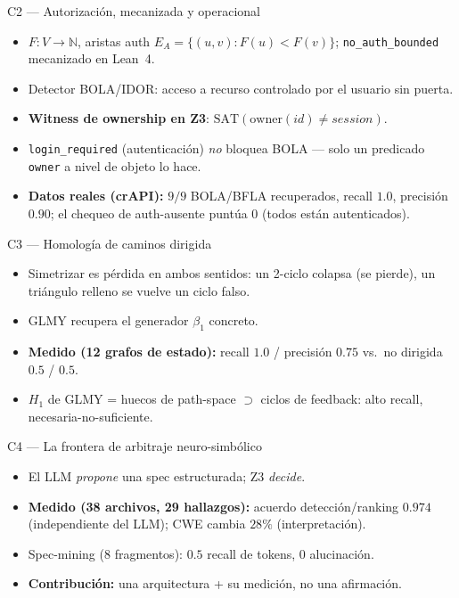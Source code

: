\documentclass[aspectratio=169,11pt]{beamer}
\newcommand{\N}{\mathbb{N}}
\begin{document}
\begin{frame}{C2 --- Autorización, mecanizada y operacional}
  \begin{itemize}
    \item $F:V\to\N$, aristas auth $E_A=\{(u,v):F(u)<F(v)\}$; \texttt{no\_auth\_bounded}
          mecanizado en Lean~4.
    \item Detector BOLA/IDOR: acceso a recurso controlado por el usuario sin puerta.
    \item \textbf{Witness de ownership en Z3}: $\mathrm{SAT}(\mathrm{owner}(id)\neq session)$.
    \item \texttt{login\_required} (autenticación) \emph{no} bloquea BOLA --- solo
          un predicado \texttt{owner} a nivel de objeto lo hace.
    \item \textbf{Datos reales (crAPI):} $9/9$ BOLA/BFLA recuperados, recall $1.0$,
          precisión $0.90$; el chequeo de auth-ausente puntúa $0$ (todos están autenticados).
  \end{itemize}
\end{frame}

\begin{frame}{C3 --- Homología de caminos dirigida}
  \begin{itemize}
    \item Simetrizar es pérdida en ambos sentidos: un 2-ciclo colapsa (se pierde),
          un triángulo relleno se vuelve un ciclo falso.
    \item GLMY recupera el generador $\beta_1$ concreto.
    \item \textbf{Medido (12 grafos de estado):} recall $1.0$ / precisión $0.75$
          vs.\ no dirigida $0.5$ / $0.5$.
    \item $H_1$ de GLMY = huecos de path-space $\supset$ ciclos de feedback:
          alto recall, necesaria-no-suficiente.
  \end{itemize}
\end{frame}

\begin{frame}{C4 --- La frontera de arbitraje neuro-simbólico}
  \begin{itemize}
    \item El LLM \emph{propone} una spec estructurada; Z3 \emph{decide}.
    \item \textbf{Medido (38 archivos, 29 hallazgos):} acuerdo detección/ranking
          $0.974$ (independiente del LLM); CWE cambia $28\%$ (interpretación).
    \item Spec-mining (8 fragmentos): $0.5$ recall de tokens, $0$ alucinación.
    \item \textbf{Contribución:} una arquitectura + su medición, no una afirmación.
  \end{itemize}
\end{frame}
\end{document}
